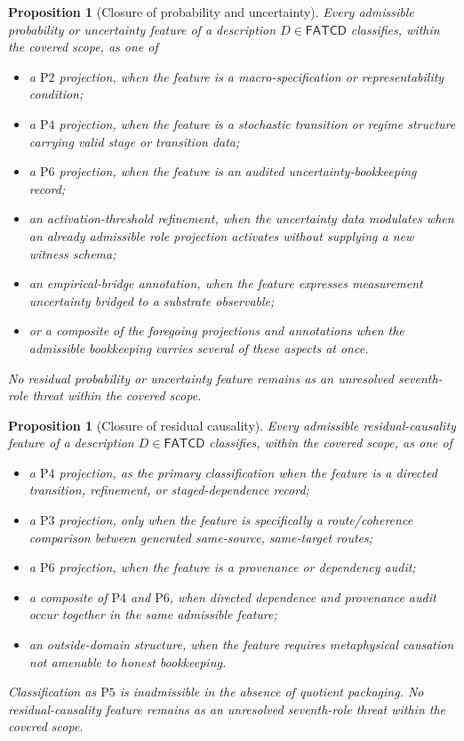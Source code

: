 \documentclass[11pt]{article}
\newtheorem{proposition}[theorem]{Proposition}
\theoremstyle{definition}
\newcommand{\FATCD}{\ensuremath{\mathsf{FATCD}}}
\newcommand{\Ptwo}{\ensuremath{\mathrm{P2}}}
\newcommand{\Pthree}{\ensuremath{\mathrm{P3}}}
\newcommand{\Pfour}{\ensuremath{\mathrm{P4}}}
\newcommand{\Pfive}{\ensuremath{\mathrm{P5}}}
\newcommand{\Psix}{\ensuremath{\mathrm{P6}}}
\begin{document}
\begin{proposition}[Closure of probability and uncertainty]\label{prop:probability-closure}
Every admissible probability or uncertainty feature of a description
\(D \in \FATCD{}\) classifies, within the covered scope, as one of
\begin{itemize}[topsep=2pt,itemsep=1pt]
  \item a \Ptwo{} projection, when the feature is a macro-specification
    or representability condition;
  \item a \Pfour{} projection, when the feature is a stochastic
    transition or regime structure carrying valid stage or transition
    data;
  \item a \Psix{} projection, when the feature is an audited
    uncertainty-bookkeeping record;
  \item an activation-threshold refinement, when the uncertainty data
    modulates when an already admissible role projection activates
    without supplying a new witness schema;
  \item an empirical-bridge annotation, when the feature expresses
    measurement uncertainty bridged to a substrate observable;
  \item or a composite of the foregoing projections and annotations when
    the admissible bookkeeping carries several of these aspects at once.
\end{itemize}
No residual probability or uncertainty feature remains as an unresolved
seventh-role threat within the covered scope.
\end{proposition}

\begin{proposition}[Closure of residual causality]\label{prop:causality-closure}
Every admissible residual-causality feature of a description
\(D \in \FATCD{}\) classifies, within the covered scope, as one of
\begin{itemize}[topsep=2pt,itemsep=1pt]
  \item a \Pfour{} projection, as the primary classification when the
    feature is a directed transition, refinement, or staged-dependence
    record;
  \item a \Pthree{} projection, only when the feature is specifically a
    route/coherence comparison between generated same-source,
    same-target routes;
  \item a \Psix{} projection, when the feature is a provenance or
    dependency audit;
  \item a composite of \Pfour{} and \Psix{}, when directed dependence
    and provenance audit occur together in the same admissible feature;
  \item an outside-domain structure, when the feature requires
    metaphysical causation not amenable to honest bookkeeping.
\end{itemize}
Classification as \Pfive{} is inadmissible in the absence of quotient
packaging. No residual-causality feature remains as an unresolved
seventh-role threat within the covered scope.
\end{proposition}
\end{document}
